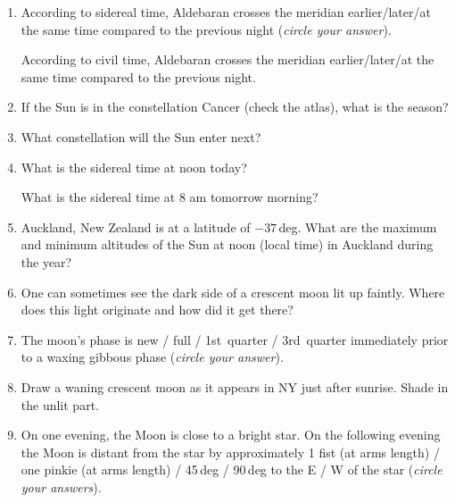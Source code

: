 \documentclass[12pt]{article}
\begin{document}
\begin{enumerate}
\item 
According to sidereal time, Aldebaran crosses the meridian
earlier/later/at the same time compared to the previous night
(\emph{circle your answer}).

According to civil time, Aldebaran crosses the meridian
earlier/later/at the same time compared to the previous night.

\item
If the Sun is in the constellation Cancer (check the atlas), what is
the season?

\vspace{0.5in}

\item
What constellation will the Sun enter next?

\vspace{0.5in}

\item
What is the sidereal time at noon today?

\vspace{0.5in}

What is the sidereal time at 8 am tomorrow morning?

\vspace{0.5in}

\item
Auckland, New Zealand is at a latitude of $-37$\,deg.  What are the
maximum and minimum altitudes of the Sun at noon (local time) in
Auckland during the year?

\vspace{1in}

\item
One can sometimes see the dark side of a crescent moon lit up faintly.
Where does this light originate and how did it get there?

\vspace{1in}

\item 
The moon's phase is new / full / 1st~quarter / 3rd~quarter immediately
prior to a waxing gibbous phase (\emph{circle your answer}).

\item
Draw a waning crescent moon as it appears in NY just after sunrise.
Shade in the unlit part.

\vspace{1.5in}

\item 
On one evening, the Moon is close to a bright star. On the following
evening the Moon is distant from the star by approximately
1 fist (at arms length) / one pinkie (at arms length) / 45\,deg / 90\,deg
to the E / W of the star (\emph{circle your answers}).


\end{enumerate}
\end{document}
